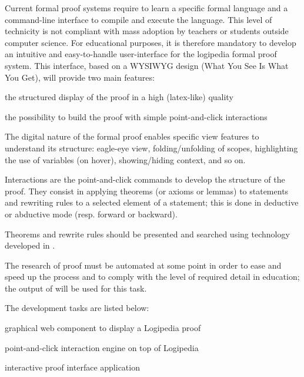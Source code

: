 \begin{workpackage}[id=access,wphases=0-48,type=MGT,
  short=Access,%
  title={Access to the infrastructure},
  lead=Irt,IrtRM=23,OcaRM=6,EduRM=12,InrRM=18]
\begin{tasklist}
  \begin{task}[id=edukera,
      title=Web interface for doing proofs at school,
      lead=Edu,EduRM=12]
      Current formal proof systems require to learn a specific formal
      language and a command-line interface to compile and execute the
      language.  This level of technicity is not compliant with mass
      adoption by teachers or students outside computer science. For
      educational purposes, it is therefore mandatory to develop an
      intuitive and easy-to-handle user-interface for the logipedia
      formal proof system. This interface, based on a WYSIWYG design
      (What You See Is What You Get), will provide two main features:
      \begin{compactitem}
      \item the structured display of the proof in a high (latex-like) quality
      \item the possibility to build the proof with simple
        point-and-click interactions
      \end{compactitem}

      The digital nature of the formal proof enables specific view features to
      understand its structure: eagle-eye view, folding/unfolding of scopes,
      highlighting the use of variables (on hover), showing/hiding context,
      and so on.

      Interactions are the point-and-click commands to develop the structure
      of the proof. They consist in applying theorems (or axioms or lemmas)
      to statements and rewriting rules to a selected element of a statement;
      this is done in deductive or abductive mode (resp. forward or backward).

      Theorems and rewrite rules should be presented and searched using
      technology developed in .

      The research of proof must be automated at some point in order to ease
      and speed up the process and to comply with the level of required detail
      in education; the output of  will be used for this task.

      The development tasks are listed below:
      \begin{compactitem}
      \item graphical web component to display a Logipedia proof
      \item point-and-click interaction engine on top of Logipedia
      \item interactive proof interface application
      \end{compactitem}


\end{task}
\end{tasklist}
\end{workpackage}
